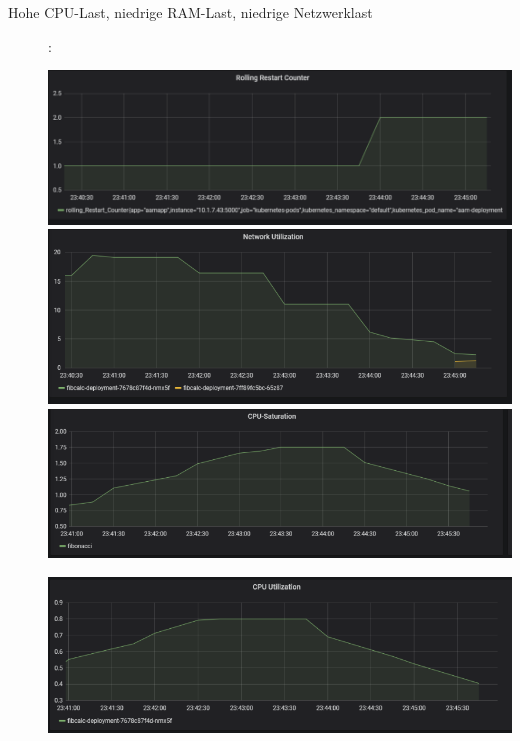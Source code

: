 \documentclass[a4paper,10pt]{scrartcl}
\begin{document}
\begin{description}
\item[Hohe CPU-Last, niedrige RAM-Last, niedrige Netzwerklast]:\\

\begin{minipage}{\linewidth}
            \includegraphics[width=1\textwidth]{img/CPUAnomalie/RollingRestart.PNG}\\
                 
            \includegraphics[width=1\textwidth]{img/CPUAnomalie/Netzwerk.PNG}\\
            
            \includegraphics[width=1\textwidth]{img/CPUAnomalie/Saturation.PNG}
\end{minipage}  

\pagebreak
\begin{minipage}{\linewidth}          
  			\includegraphics[width=1\textwidth]{img/CPUAnomalie/Utilization.PNG}
\end{minipage}


\end{description}
\end{document}
